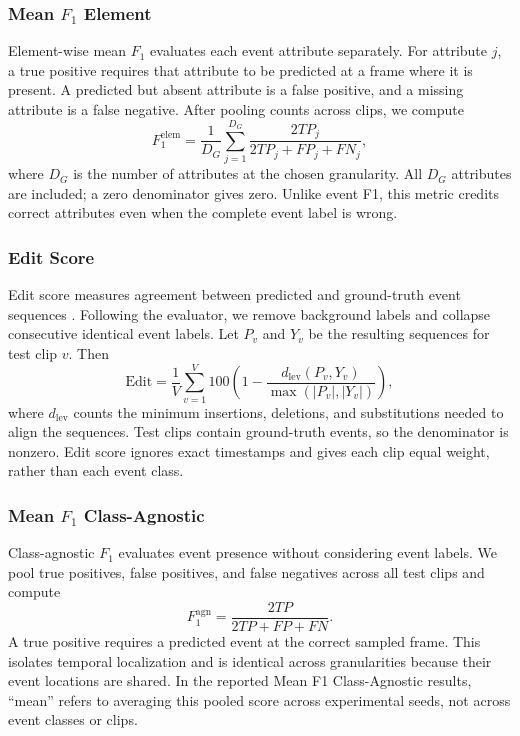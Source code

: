 \subsubsection{Mean $F_1$ Element}
Element-wise mean $F_1$ evaluates each event attribute separately. For attribute $j$, a true positive requires that attribute to be predicted at a frame where it is present. A predicted but absent attribute is a false positive, and a missing attribute is a false negative. After pooling counts across clips, we compute
\begin{equation}
    F_1^{\mathrm{elem}}=\frac{1}{D_G}\sum_{j=1}^{D_G}
        \frac{2TP_j}{2TP_j+FP_j+FN_j},
\end{equation}
where $D_G$ is the number of attributes at the chosen granularity. All $D_G$ attributes are included; a zero denominator gives zero. Unlike event F1, this metric credits correct attributes even when the complete event label is wrong.

\subsubsection{Edit Score}
Edit score measures agreement between predicted and ground-truth event sequences \autocite{liu_f3set_2025}. Following the evaluator, we remove background labels and collapse consecutive identical event labels. Let $P_v$ and $Y_v$ be the resulting sequences for test clip $v$. Then
\begin{equation}
    \mathrm{Edit}=\frac{1}{V}\sum_{v=1}^{V}
        100\left(1-\frac{d_{\mathrm{lev}}(P_v,Y_v)}
        {\max(|P_v|,|Y_v|)}\right),
\end{equation}
where $d_{\mathrm{lev}}$ counts the minimum insertions, deletions, and substitutions needed to align the sequences. Test clips contain ground-truth events, so the denominator is nonzero. Edit score ignores exact timestamps and gives each clip equal weight, rather than each event class.

\subsubsection{Mean $F_1$ Class-Agnostic}
Class-agnostic $F_1$ evaluates event presence without considering event labels. We pool true positives, false positives, and false negatives across all test clips and compute
\begin{equation}
    F_1^{\mathrm{agn}}=\frac{2TP}{2TP+FP+FN}.
\end{equation}
A true positive requires a predicted event at the correct sampled frame. This isolates temporal localization and is identical across granularities because their event locations are shared. In the reported Mean F1 Class-Agnostic results, ``mean'' refers to averaging this pooled score across experimental seeds, not across event classes or clips.

